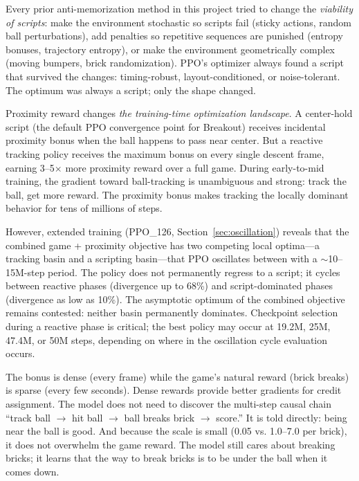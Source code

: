 \documentclass[11pt]{article}
\begin{document}
Every prior anti-memorization method in this project tried to change the
\emph{viability of scripts}: make the environment stochastic so scripts fail
(sticky actions, random ball perturbations), add penalties so repetitive
sequences are punished (entropy bonuses, trajectory entropy), or make the
environment geometrically complex (moving bumpers, brick randomization). PPO's
optimizer always found a script that survived the changes: timing-robust,
layout-conditioned, or noise-tolerant. The optimum was always a script; only
the shape changed.

Proximity reward changes \emph{the training-time optimization landscape}. A
center-hold script (the default PPO convergence point for Breakout) receives
incidental proximity bonus when the ball happens to pass near center. But a
reactive tracking policy receives the maximum bonus on every single descent
frame, earning 3--5$\times$ more proximity reward over a full game. During
early-to-mid training, the gradient toward ball-tracking is unambiguous and
strong: track the ball, get more reward. The proximity bonus makes tracking
the locally dominant behavior for tens of millions of steps.

However, extended training (PPO\_126, Section~\ref{sec:oscillation})
reveals that the combined game + proximity objective has two competing local
optima---a tracking basin and a scripting basin---that PPO oscillates
between with a $\sim$10--15M-step period. The policy does not permanently
regress to a script; it cycles between reactive phases (divergence up to
68\%) and script-dominated phases (divergence as low as 10\%). The
asymptotic optimum of the combined objective remains contested: neither
basin permanently dominates. Checkpoint selection during a reactive phase is
critical; the best policy may occur at 19.2M, 25M, 47.4M, or 50M steps,
depending on where in the oscillation cycle evaluation occurs.

The bonus is dense (every frame) while the game's natural reward (brick
breaks) is sparse (every few seconds). Dense rewards provide better gradients
for credit assignment. The model does not need to discover the multi-step
causal chain ``track ball $\rightarrow$ hit ball $\rightarrow$ ball breaks
brick $\rightarrow$ score.'' It is told directly: being near the ball is good.
And because the scale is small (0.05 vs. 1.0--7.0 per brick), it does not
overwhelm the game reward. The model still cares about breaking bricks; it
learns that the way to break bricks is to be under the ball when it comes down.
\end{document}
